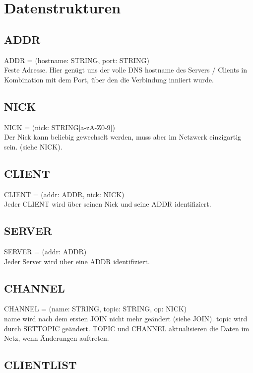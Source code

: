 \documentclass{article}
\begin{document}
\section{Datenstrukturen}

\subsection{ADDR}

ADDR = (hostname: STRING, port: STRING)\\
Feste Adresse. Hier genügt uns der volle DNS hostname des Servers / Clients in Kombination mit dem Port, über den die Verbindung inniiert wurde.

\subsection{NICK}

NICK = (nick: STRING[a-zA-Z0-9])\\
Der Nick kann beliebig gewechselt werden, muss aber im Netzwerk einzigartig sein. (siehe NICK).

\subsection{CLIENT}

CLIENT = (addr: ADDR, nick: NICK)\\
Jeder CLIENT wird über seinen Nick und seine ADDR identifiziert. 

\subsection{SERVER}

SERVER = (addr: ADDR)\\
Jeder Server wird über eine ADDR identifiziert.

\subsection{CHANNEL}

CHANNEL = (name: STRING, topic: STRING, op: NICK)\\
name wird nach dem ersten JOIN nicht mehr geändert (siehe JOIN). topic wird durch SETTOPIC geändert. TOPIC und CHANNEL aktualisieren die Daten im Netz, wenn Änderungen auftreten.

\subsection{CLIENTLIST}
\end{document}
